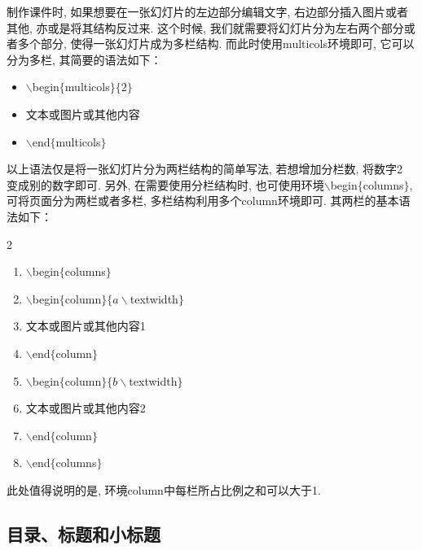 制作课件时, 如果想要在一张幻灯片的左边部分编辑文字, 右边部分插入图片或者其他, 亦或是将其结构反过来. 这个时候, 我们就需要将幻灯片分为左右两个部分或者多个部分, 使得一张幻灯片成为多栏结构. 而此时使用multicols环境即可, 它可以分为多栏, 其简要的语法如下：

 \begin{itemize}
  \item $\backslash$begin$\{$multicols$\}\{2\}$
  \item 文本或图片或其他内容
 \item$\backslash$end$\{$multicols$\}$
\end{itemize}


以上语法仅是将一张幻灯片分为两栏结构的简单写法, 若想增加分栏数, 将数字2 变成别的数字即可. 另外, 在需要使用分栏结构时, 也可使用环境$\backslash$begin$\{$columns$\}$, 可将页面分为两栏或者多栏, 多栏结构利用多个column环境即可. 其两栏的基本语法如下：

 \begin{multicols}{2}
 \begin{enumerate}
     \item$\backslash$begin$\{$columns$\}$
     \item$\backslash$begin$\{$column$\}\{a\backslash$textwidth$\}$
     \item 文本或图片或其他内容1
     \item$\backslash$end$\{$column$\}$
     \item$\backslash$begin$\{$column$\}\{b\backslash$textwidth$\}$
     \item 文本或图片或其他内容2
     \item$\backslash$end$\{$column$\}$
     \item$\backslash$end$\{$columns$\}$
 \end{enumerate}
 \end{multicols}

 此处值得说明的是, 环境column中每栏所占比例之和可以大于1.

\subsection{目录、标题和小标题}

